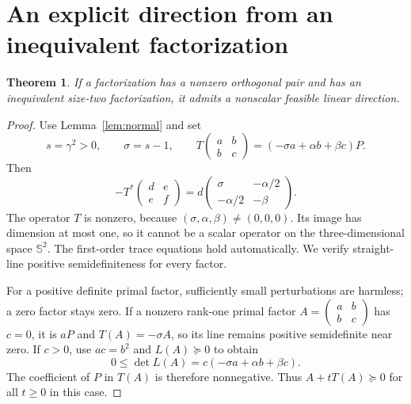 \documentclass[11pt]{article}
\newtheorem{theorem}{Theorem}
\newcommand{\Sym}{\mathbb S^2}
\begin{document}
\section{An explicit direction from an inequivalent factorization}
\begin{theorem}\label{thm:construction}
If a factorization has a nonzero orthogonal pair and has an inequivalent size-two factorization, it admits a nonscalar feasible linear direction.
\end{theorem}
\begin{proof}
Use Lemma~\ref{lem:normal} and set
\[
 s=\gamma^2>0,\qquad \sigma=s-1,
 \qquad
 T\begin{pmatrix}a&b\\b&c\end{pmatrix}
 =(-\sigma a+\alpha b+\beta c)P.
\]
Then
\begin{equation}\label{eq:dual-direction}
 -T^*\begin{pmatrix}d&e\\e&f\end{pmatrix}
 =d\begin{pmatrix}\sigma&-\alpha/2\\-\alpha/2&-\beta\end{pmatrix}.
\end{equation}
The operator $T$ is nonzero, because $(\sigma,\alpha,\beta)\ne(0,0,0)$. Its image has dimension at most one, so it cannot be a scalar operator on the three-dimensional space $\Sym$. The first-order trace equations hold automatically. We verify straight-line positive semidefiniteness for every factor.

For a positive definite primal factor, sufficiently small perturbations are harmless; a zero factor stays zero. If a nonzero rank-one primal factor $A=\left(\begin{smallmatrix}a&b\\b&c\end{smallmatrix}\right)$ has $c=0$, it is $aP$ and $T(A)=-\sigma A$, so its line remains positive semidefinite near zero. If $c>0$, use $ac=b^2$ and $L(A)\succeq0$ to obtain
\[
 0\leq\det L(A)
 =c(-\sigma a+\alpha b+\beta c).
\]
The coefficient of $P$ in $T(A)$ is therefore nonnegative. Thus $A+tT(A)\succeq0$ for all $t\geq0$ in this case.


\end{proof}
\end{document}
